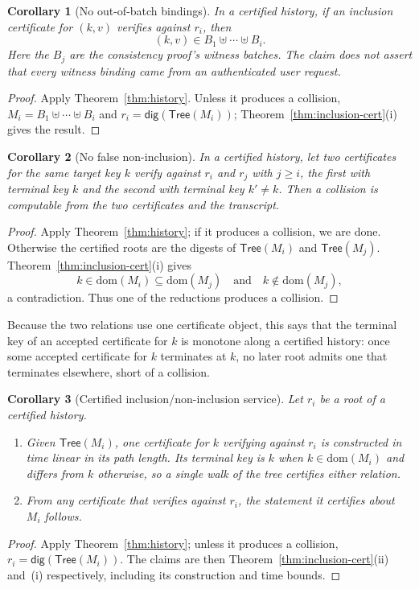 \documentclass[11pt]{article}
\newtheorem{corollary}{Corollary}
\begin{document}
\begin{corollary}[No out-of-batch bindings]
\label{cor:batchbound}
In a certified history, if an inclusion certificate for $(k,v)$ verifies against $r_i$, then
\[
  (k,v)\in B_1\uplus\cdots\uplus B_i.
\]
Here the $B_j$ are the consistency proof's witness batches. The claim does not assert that every witness binding came from an authenticated user request.
\end{corollary}
\begin{proof}
Apply Theorem~\ref{thm:history}. Unless it produces a collision, $M_i=B_1\uplus\cdots\uplus B_i$ and $r_i=\mathsf{dig}(\mathsf{Tree}(M_i))$; Theorem~\ref{thm:inclusion-cert}(i) gives the result.
\end{proof}

\begin{corollary}[No false non-inclusion]
\label{cor:noninc}
In a certified history, let two certificates for the same target key $k$ verify against $r_i$ and $r_j$ with $j\geq i$, the first with terminal key $k$ and the second with terminal key $k'\neq k$. Then a collision is computable from the two certificates and the transcript.
\end{corollary}
\begin{proof}
Apply Theorem~\ref{thm:history}; if it produces a collision, we are done. Otherwise the certified roots are the digests of $\mathsf{Tree}(M_i)$ and $\mathsf{Tree}(M_j)$. Theorem~\ref{thm:inclusion-cert}(i) gives
\[
  k\in\mathrm{dom}(M_i)\subseteq\mathrm{dom}(M_j)
  \quad\text{and}\quad
  k\notin\mathrm{dom}(M_j),
\]
a contradiction. Thus one of the reductions produces a collision.
\end{proof}

Because the two relations use one certificate object, this says that the terminal key of an accepted certificate for $k$ is monotone along a certified history: once some accepted certificate for $k$ terminates at $k$, no later root admits one that terminates elsewhere, short of a collision.

\begin{corollary}[Certified inclusion/non-inclusion service]
\label{cor:service}
Let $r_i$ be a root of a certified history.
\begin{enumerate}[nosep,label=(\roman*)]
  \item Given $\mathsf{Tree}(M_i)$, one certificate for $k$ verifying against $r_i$ is constructed in time linear in its path length. Its terminal key is $k$ when $k\in\mathrm{dom}(M_i)$ and differs from $k$ otherwise, so a single walk of the tree certifies either relation.
  \item From any certificate that verifies against $r_i$, the statement it certifies about $M_i$ follows.
\end{enumerate}
\end{corollary}
\begin{proof}
Apply Theorem~\ref{thm:history}; unless it produces a collision, $r_i=\mathsf{dig}(\mathsf{Tree}(M_i))$. The claims are then Theorem~\ref{thm:inclusion-cert}(ii) and~(i) respectively, including its construction and time bounds.
\end{proof}
\end{document}
